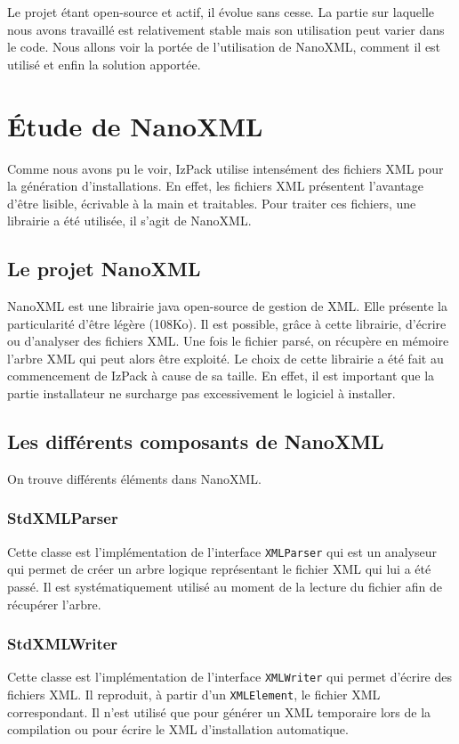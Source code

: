 Le projet étant open-source et actif, il évolue sans cesse. La partie sur laquelle nous avons travaillé est relativement stable mais son utilisation peut varier dans le code. Nous allons voir la portée de l'utilisation de NanoXML, comment il est utilisé et enfin la solution apportée.

\section{Étude de NanoXML}
Comme nous avons pu le voir, IzPack utilise intensément des fichiers XML pour la génération d'installations.
En effet, les fichiers XML présentent l'avantage d'être lisible, écrivable à la main et traitables.
Pour traiter ces fichiers, une librairie a été utilisée, il s'agit de NanoXML.
\subsection{Le projet NanoXML}
NanoXML est une librairie java open-source de gestion de XML.
Elle présente la particularité d'être légère (108Ko).
Il est possible, grâce à cette librairie, d'écrire ou d'analyser des fichiers XML.
Une fois le fichier parsé, on récupère en mémoire l'arbre XML qui peut alors être exploité.
Le choix de cette librairie a été fait au commencement de IzPack à cause de sa taille.
En effet, il est important que la partie installateur ne surcharge pas excessivement le logiciel à installer.

\subsection{Les différents composants de NanoXML}
On trouve différents éléments dans NanoXML.
\subsubsection{StdXMLParser}
Cette classe est l'implémentation de l'interface \verb|XMLParser| qui est un analyseur qui permet de créer un arbre logique représentant le fichier XML qui lui a été passé.
Il est systématiquement utilisé au moment de la lecture du fichier afin de récupérer l'arbre.
\subsubsection{StdXMLWriter}
Cette classe est l'implémentation de l'interface \verb|XMLWriter| qui permet d'écrire des fichiers XML.
Il reproduit, à partir d'un \verb|XMLElement|, le fichier XML correspondant.
Il n'est utilisé que pour générer un XML temporaire lors de la compilation ou pour écrire le XML d'installation automatique.
